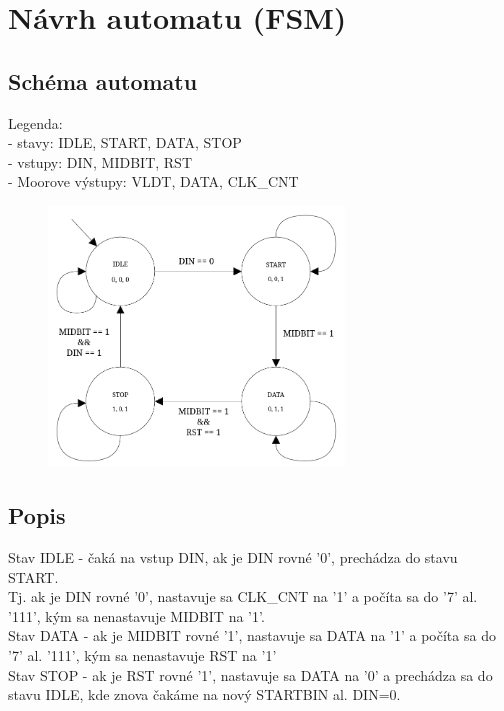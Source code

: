 \documentclass[11pt]{article}
\begin{document}
\section{Návrh automatu (FSM)}
\subsection{Schéma automatu}
Legenda:\\
- stavy: IDLE, START, DATA, STOP\\
- vstupy: DIN, MIDBIT, RST\\
- Moorove výstupy: VLDT, DATA, CLK\_CNT\\
\begin{figure}[here]
    \centering
    \includegraphics[width=0.7\textwidth]{automat.png} %
\end{figure}

\subsection{Popis}
Stav IDLE - čaká na vstup DIN, ak je DIN rovné '0', prechádza do stavu START.\\
Tj. ak je DIN rovné '0', nastavuje sa CLK\_CNT na '1' a počíta sa do '7' al. '111', kým sa nenastavuje MIDBIT na '1'.\\
Stav DATA - ak je MIDBIT rovné '1', nastavuje sa DATA na '1' a počíta sa do '7' al. '111', kým sa nenastavuje RST na '1'\\
Stav STOP - ak je RST rovné '1', nastavuje sa DATA na '0' a prechádza sa do stavu IDLE, kde znova čakáme na nový STARTBIN al. DIN=0.\\
\end{document}
